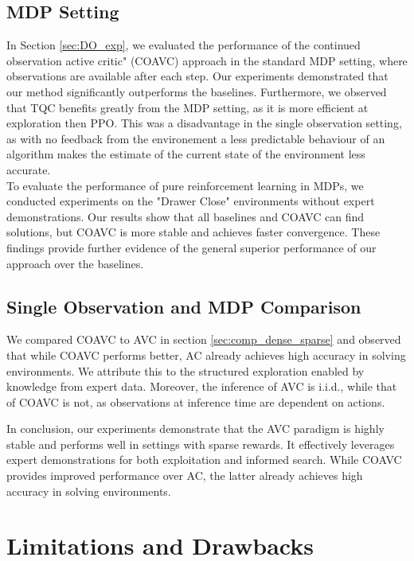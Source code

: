 \subsection{MDP Setting}
In Section \ref{sec:DO_exp}, we evaluated the performance of the continued observation active critic" (COAVC) approach in the standard MDP setting, 
where observations are available after each step. Our experiments demonstrated that our 
method significantly outperforms the baselines. Furthermore, we observed that TQC benefits greatly 
from the MDP setting, as it is more efficient at exploration then PPO. This was a disadvantage in the single observation setting, as with no feedback 
from the environement a less predictable behaviour of an algorithm makes the estimate of the current state of the environment less accurate.\\
To evaluate the performance of pure reinforcement learning in MDPs, we conducted experiments on the "Drawer Close" 
environments without expert demonstrations. Our results show that all baselines and COAVC can find solutions, but COAVC is more stable and achieves 
faster convergence. These findings provide further evidence of the general superior performance of our approach over the baselines. 

\subsection{Single Observation and MDP Comparison}
We compared COAVC to AVC in section \ref{sec:comp_dense_sparse} and observed that while COAVC performs better, 
AC already achieves high accuracy in solving environments. We attribute this to the structured exploration enabled by knowledge from 
expert data. Moreover, the inference of AVC is i.i.d., while that of COAVC is not, as observations at inference time are dependent on actions. 

In conclusion, our experiments demonstrate that the AVC paradigm is highly stable and performs well in settings with sparse rewards. 
It effectively leverages expert demonstrations for both exploitation and informed search. While COAVC provides improved performance over 
AC, the latter already achieves high accuracy in solving environments.

\section{Limitations and Drawbacks}
